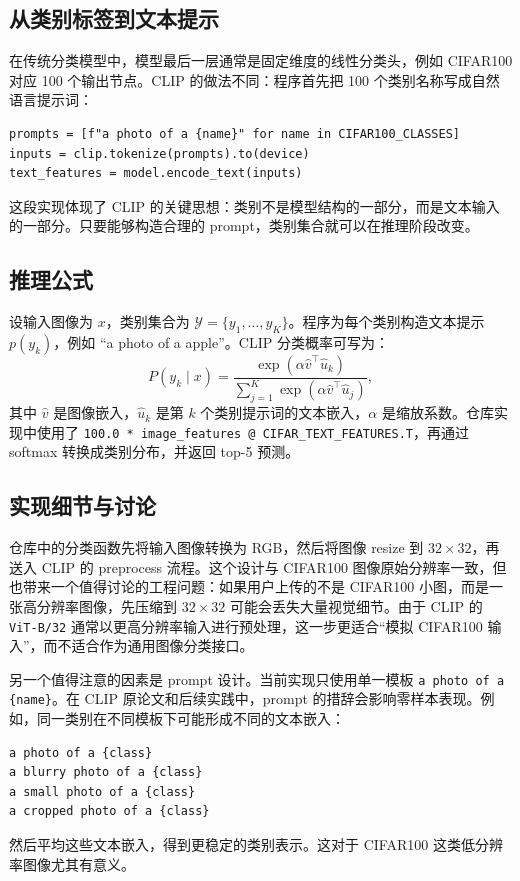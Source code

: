 \documentclass[UTF8,zihao=-4]{ctexart}
\begin{document}
\subsection{从类别标签到文本提示}

在传统分类模型中，模型最后一层通常是固定维度的线性分类头，例如 CIFAR100 对应 100 个输出节点。CLIP 的做法不同：程序首先把 100 个类别名称写成自然语言提示词：
\begin{lstlisting}
prompts = [f"a photo of a {name}" for name in CIFAR100_CLASSES]
inputs = clip.tokenize(prompts).to(device)
text_features = model.encode_text(inputs)
\end{lstlisting}

这段实现体现了 CLIP 的关键思想：类别不是模型结构的一部分，而是文本输入的一部分。只要能够构造合理的 prompt，类别集合就可以在推理阶段改变。

\subsection{推理公式}

设输入图像为 $x$，类别集合为 $\mathcal{Y} = \{y_1,\ldots,y_K\}$。程序为每个类别构造文本提示 $p(y_k)$，例如 ``a photo of a apple''。CLIP 分类概率可写为：
\begin{equation}
  P(y_k \mid x) =
  \frac{
    \exp(\alpha \hat{v}^{\top}\hat{u}_k)
  }{
    \sum_{j=1}^{K}\exp(\alpha \hat{v}^{\top}\hat{u}_j)
  },
\end{equation}
其中 $\hat{v}$ 是图像嵌入，$\hat{u}_k$ 是第 $k$ 个类别提示词的文本嵌入，$\alpha$ 是缩放系数。仓库实现中使用了 \texttt{100.0 * image\_features @ CIFAR\_TEXT\_FEATURES.T}，再通过 softmax 转换成类别分布，并返回 top-5 预测。

\subsection{实现细节与讨论}

仓库中的分类函数先将输入图像转换为 RGB，然后将图像 resize 到 $32 \times 32$，再送入 CLIP 的 preprocess 流程。这个设计与 CIFAR100 图像原始分辨率一致，但也带来一个值得讨论的工程问题：如果用户上传的不是 CIFAR100 小图，而是一张高分辨率图像，先压缩到 $32 \times 32$ 可能会丢失大量视觉细节。由于 CLIP 的 \texttt{ViT-B/32} 通常以更高分辨率输入进行预处理，这一步更适合“模拟 CIFAR100 输入”，而不适合作为通用图像分类接口。

另一个值得注意的因素是 prompt 设计。当前实现只使用单一模板 \texttt{a photo of a \{name\}}。在 CLIP 原论文和后续实践中，prompt 的措辞会影响零样本表现。例如，同一类别在不同模板下可能形成不同的文本嵌入：
\begin{lstlisting}
a photo of a {class}
a blurry photo of a {class}
a small photo of a {class}
a cropped photo of a {class}
\end{lstlisting}
然后平均这些文本嵌入，得到更稳定的类别表示。这对于 CIFAR100 这类低分辨率图像尤其有意义。
\end{document}
